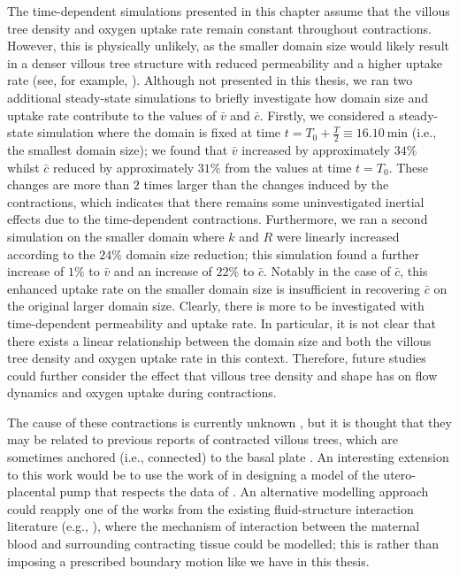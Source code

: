         The time-dependent simulations presented in this chapter assume that the villous tree density and oxygen uptake rate remain constant throughout contractions. However, this is physically unlikely, as the smaller domain size would likely result in a denser villous tree structure with reduced permeability and a higher uptake rate (see, for example, \citeauthor{serovOptimalVilliDensity2015} \cite{serovOptimalVilliDensity2015}). Although not presented in this thesis, we ran two additional steady-state simulations to briefly investigate how domain size and uptake rate contribute to the values of $\bar{v}$ and $\bar{c}$. Firstly, we considered a steady-state simulation where the domain is fixed at time $t = T_0 + \frac{T}{2} \equiv \qty{16.10}{\minute}$ (i.e., the smallest domain size); we found that $\bar{v}$ increased by approximately $34\%$ whilst $\bar{c}$ reduced by approximately $31\%$ from the values at time $t = T_0$. These changes are more than $2$ times larger than the changes induced by the contractions, which indicates that there remains some uninvestigated inertial effects due to the time-dependent contractions. Furthermore, we ran a second simulation on the smaller domain where $k$ and $R$ were linearly increased according to the $24\%$ domain size reduction; this simulation found a further increase of $1\%$ to $\bar{v}$ and an increase of $22\%$ to $\bar{c}$. Notably in the case of $\bar{c}$, this enhanced uptake rate on the smaller domain size is insufficient in recovering $\bar{c}$ on the original larger domain size. Clearly, there is more to be investigated with time-dependent permeability and uptake rate. In particular, it is not clear that there exists a linear relationship between the domain size and both the villous tree density and oxygen uptake rate in this context. Therefore, future studies could further consider the effect that villous tree density and shape has on flow dynamics and oxygen uptake during contractions.

        The cause of these contractions is currently unknown \cite{dellschaftHaemodynamicsHumanPlacenta2020}, but it is thought that they may be related to previous reports of contracted villous trees, which are sometimes anchored (i.e., connected) to the basal plate \cite{dellschaftHaemodynamicsHumanPlacenta2020,katoVillousTreeModel2017}. An interesting extension to this work would be to use the work of \citeauthor{katoVillousTreeModel2017} \cite{katoVillousTreeModel2017} in designing a model of the utero-placental pump that respects the data of \citeauthor{gowlandCharacterisingPlacentalContractions2024} \cite{gowlandCharacterisingPlacentalContractions2024}. An alternative modelling approach could reapply one of the works from the existing fluid-structure interaction literature (e.g., \cite{houNumericalMethodsFluidStructure2012,doneaArbitraryLagrangianEulerian2004,ricardodasilvaNumericalSimulationsFluidstructure2007,collisEffectiveEquationsGoverning2017,formaggiaCardiovascularMathematicsModeling2010}), where the mechanism of interaction between the maternal blood and surrounding contracting tissue could be modelled; this is rather than imposing a prescribed boundary motion like we have in this thesis. 

